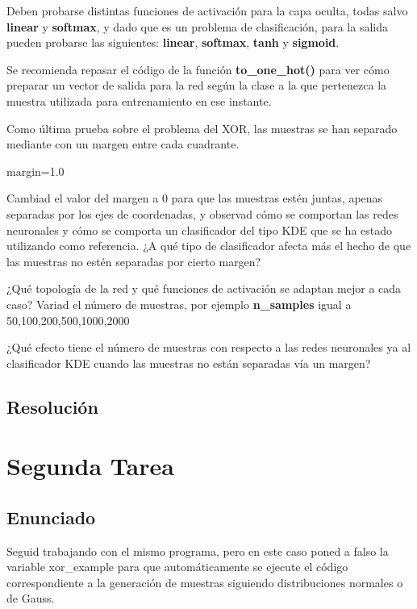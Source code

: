 \documentclass[12pt,twoside]{article}
\begin{document}
Deben probarse distintas funciones de activación para la capa oculta, todas salvo \textbf{linear} y \textbf{softmax}, y dado que es un problema de clasificación, para la salida pueden probarse las siguientes: \textbf{linear}, \textbf{softmax}, \textbf{tanh} y \textbf{sigmoid}.

Se recomienda repasar el código de la función \textbf{to\_one\_hot()} para ver cómo preparar un vector de salida para la red según la clase a la que pertenezca la muestra utilizada para entrenamiento en ese instante.

Como última prueba sobre el problema del XOR, las muestras se han separado mediante con un margen entre cada cuadrante.
\begin{center}
\textsf{margin=1.0}
\end{center}
Cambiad el valor del margen a 0 para que las muestras estén juntas, apenas separadas por los ejes de coordenadas, y observad cómo se comportan las redes neuronales y cómo se comporta un clasificador del tipo KDE que se ha estado utilizando como referencia. ¿A qué tipo de clasificador afecta más el hecho de que las muestras no estén separadas por cierto margen?

¿Qué topología de la red y qué funciones de activación se adaptan mejor a cada caso?
Variad el número de muestras, por ejemplo \textbf{n\_samples} igual a {50,100,200,500,1000,2000}

¿Qué efecto tiene el número de muestras con respecto a las redes neuronales ya al clasificador KDE cuando las muestras no están separadas vía un margen?



\subsection{Resolución}


\section{Segunda Tarea}

\subsection{Enunciado}
Seguid trabajando con el mismo programa, pero en este caso poned a falso la variable \textsf{xor\_example} para que automáticamente se ejecute el código correspondiente a la generación de muestras siguiendo distribuciones normales o de Gauss.
\end{document}
